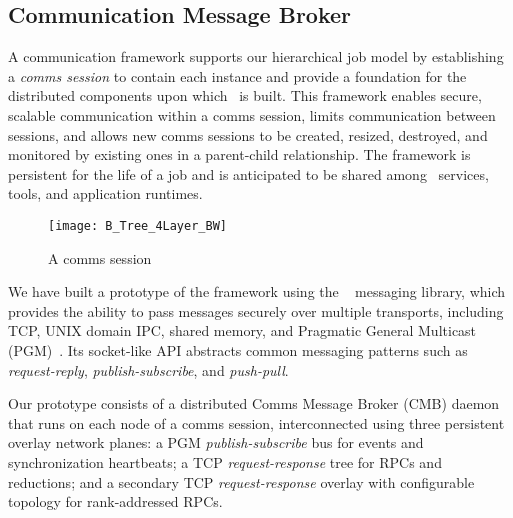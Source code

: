 \subsection{Communication Message Broker}

A communication framework supports our hierarchical job model
by establishing a {\em comms session} to contain each \flux instance
and provide a foundation for the distributed components upon which
\flux\ is built.
This framework enables secure, scalable communication
within a comms session, limits communication between sessions,
and allows new comms sessions to be created, resized, destroyed,
and monitored by existing ones in a parent-child relationship.
The framework is persistent for the life of a job and is anticipated to be
shared among \flux\ services, tools, and application runtimes.

\begin{figure}
\centering
\texttt{[image: B\_Tree\_4Layer\_BW]}
\vspace{-.3cm}
\caption{A comms session} 
\vspace{-.5cm}
\label{fig:commswireup}
\end{figure}

We have built a prototype of the framework using the \zMQ~\cite{ZMQGuide}
messaging library, which provides the ability to pass messages securely
over multiple transports, including TCP, UNIX domain IPC, shared memory, and
Pragmatic General Multicast (PGM)~\cite{rfc3208}.
Its socket-like API abstracts common messaging patterns such as
{\em request-reply}, {\em publish-subscribe},
and {\em push-pull}.

Our prototype consists of a distributed Comms Message Broker (CMB)
daemon that runs on each node of a comms session, interconnected using
three persistent overlay network planes:
a PGM {\em publish-subscribe} bus for events and synchronization heartbeats;
a TCP {\em request-response} tree for RPCs and reductions; and
a secondary TCP {\em request-response} overlay with configurable topology
for rank-addressed RPCs.


